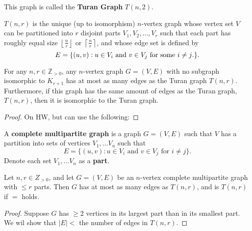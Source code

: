 
This graph is called the \textbf{Turan Graph} \( T(n, 2) \).

\begin{definition}
	\( T(n, r) \) is the unique (up to isomorphism) \( n \)-vertex graph whose vertex set \( V \) can be partitioned into \( r \) disjoint parts \( V_{1},V_{2},\ldots,V_r \) such that each part has roughly equal size \( \left\lfloor \frac{n}{r} \right\rfloor \) or \( \left\lceil \frac{n}{r} \right\rceil  \), and whose edge set is defined by \[
		E = \{(u, v) : u \in V_i \text{ and } v \in V_j \text{ for some \( i\neq j \).}\}  
	.\]  
\end{definition}

\begin{theorem}
	For any \( n,r\in \mathbb{Z}_{>0} \), any \( n \)-vertex graph \( G=(V,E) \) with no subgraph isomorphic to \( K_{r+1} \) has at most as many edges as the Turan graph \( T(n, r) \). Furthermore, if this graph has the same amount of edges as the Turan graph, \( T(n, r) \), then it is isomorphic to the Turan graph.
\end{theorem}
\begin{proof}
	On HW, but can use the following:
\end{proof}

\begin{definition}
	A \textbf{complete multipartite graph} is a graph \( G=(V,E) \) such that \( V \) has a partition into sets of vertices \( V_{1},\ldots V_n \) such that \[
		E = \{(u, v) : u \in V_i \text{ and } v \in V_j \text{ for } i\neq j\}  
	.\] Denote each set \( V_{1},\ldots V_n \) as a \textbf{part}.
\end{definition}

\begin{lemma}
	Let \( n,r \in Z_{>0}\), and let \( G=(V,E) \) be an \( n \)-vertex complete multipartite graph with \( \le r \) parts. Then \( G \) has at most as many edges as \( T(n, r) \), and is \( T(n, r) \) if \( = \) holds.
\end{lemma}
\begin{proof}
	Suppose \( G \) has \( \ge 2 \) vertices in its largest part than in its smallest part. We wil show that \( |E| <  \) the number of edges in \( T(n, r) \).
\end{proof}
